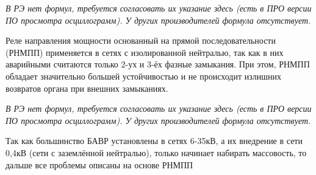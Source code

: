 \noindent\textit{В РЭ нет формул, требуется согласовать их указание здесь (есть в ПРО версии ПО просмотра осциллограмм). У других производителей формула отсутствует.}\par\vspace{0.2cm}

Реле направления мощности основанный на прямой последовательности (РНМПП) применяется в
сетях с изолированной нейтралью, так как в них аварийными считаются только 2-ух и 3-ёх
фазные замыкания. При этом, РНМПП обладает значительно большей устойчивостью и не
происходит излишних возвратов органа при внешних замыканиях.\par\vspace{0.2cm}

\par\vspace{0.2cm}

\noindent\textit{В РЭ нет формул, требуется согласовать их указание здесь (есть в ПРО версии ПО просмотра осциллограмм). У других производителей формула отсутствует.}\par\vspace{0.2cm}

\par\vspace{0.2cm}

Так как большинство БАВР установлены в сетях 6-35кВ, а их внедрение в сети 0,4кВ (сети с
заземлённой нейтралью), только начинает набирать массовость, то дальше все проблемы
описаны на основе РНМПП\par\vspace{0.2cm}

